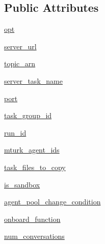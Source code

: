 \subsection*{Public Attributes}
\begin{DoxyCompactItemize}
\item 
\hyperlink{classparlai_1_1mturk_1_1core_1_1mturk__manager_1_1MTurkManager_a1167cb8359db58221b2843554731cf1b}{opt}
\item 
\hyperlink{classparlai_1_1mturk_1_1core_1_1mturk__manager_1_1MTurkManager_a498ab33751e066efb2887a0569e63eaa}{server\+\_\+url}
\item 
\hyperlink{classparlai_1_1mturk_1_1core_1_1mturk__manager_1_1MTurkManager_a5214fff44afe69cfeda3937e6c371200}{topic\+\_\+arn}
\item 
\hyperlink{classparlai_1_1mturk_1_1core_1_1mturk__manager_1_1MTurkManager_a47f60b6caf7eac407d1f8b34c37141e3}{server\+\_\+task\+\_\+name}
\item 
\hyperlink{classparlai_1_1mturk_1_1core_1_1mturk__manager_1_1MTurkManager_a43a266ab76a8ccaf36bd3656ca1f1238}{port}
\item 
\hyperlink{classparlai_1_1mturk_1_1core_1_1mturk__manager_1_1MTurkManager_ab1db971037f660cc2809748aa9bcd51d}{task\+\_\+group\+\_\+id}
\item 
\hyperlink{classparlai_1_1mturk_1_1core_1_1mturk__manager_1_1MTurkManager_aa494ad0cdad092ee7acde6f89cb61d6a}{run\+\_\+id}
\item 
\hyperlink{classparlai_1_1mturk_1_1core_1_1mturk__manager_1_1MTurkManager_a87bbfdb15a8c5d57488bcd140cd1ede7}{mturk\+\_\+agent\+\_\+ids}
\item 
\hyperlink{classparlai_1_1mturk_1_1core_1_1mturk__manager_1_1MTurkManager_a26700e334c3ba674abca4e02d05f8d9e}{task\+\_\+files\+\_\+to\+\_\+copy}
\item 
\hyperlink{classparlai_1_1mturk_1_1core_1_1mturk__manager_1_1MTurkManager_a03da264fcd7749e299714ba9ea0f1af0}{is\+\_\+sandbox}
\item 
\hyperlink{classparlai_1_1mturk_1_1core_1_1mturk__manager_1_1MTurkManager_afc99b8e79f6d19d4e87ed2bf74d0749f}{agent\+\_\+pool\+\_\+change\+\_\+condition}
\item 
\hyperlink{classparlai_1_1mturk_1_1core_1_1mturk__manager_1_1MTurkManager_a4166f7b21495f2451d0fd90a716903f8}{onboard\+\_\+function}
\item 
\hyperlink{classparlai_1_1mturk_1_1core_1_1mturk__manager_1_1MTurkManager_a68847473549bc89eac1b17b909385fad}{num\+\_\+conversations}
\item 

\end{DoxyCompactItemize}
